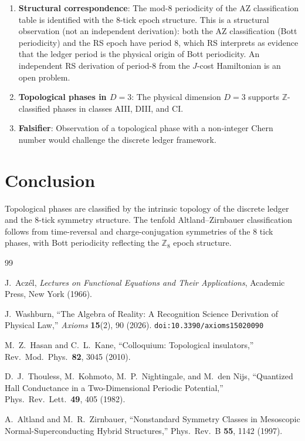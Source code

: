 \documentclass[12pt,a4paper]{article}
\theoremstyle{definition}
\theoremstyle{remark}
\begin{document}
\begin{enumerate}
  \item \textbf{Structural correspondence}: The mod-8 periodicity
  of the AZ classification table is identified with the 8-tick epoch
  structure.  This is a structural observation (not an independent
  derivation): both the AZ classification (Bott periodicity) and
  the RS epoch have period 8, which RS interprets as evidence that
  the ledger period is the physical origin of Bott periodicity.
  An independent RS derivation of period-8 from the $J$-cost
  Hamiltonian is an open problem.

  \item \textbf{Topological phases in $D = 3$}: The physical
  dimension $D = 3$ supports $\mathbb{Z}$-classified phases in
  classes AIII, DIII, and CI.

  \item \textbf{Falsifier}: Observation of a topological phase
  with a non-integer Chern number would challenge the discrete
  ledger framework.
\end{enumerate}

\section{Conclusion}
\label{sec:conclusion}

Topological phases are classified by the intrinsic topology of the
discrete ledger and the 8-tick symmetry structure.  The tenfold
Altland--Zirnbauer classification follows from time-reversal and
charge-conjugation symmetries of the 8 tick phases, with Bott
periodicity reflecting the $\mathbb{Z}_8$ epoch structure.

\begin{thebibliography}{99}

J.~Acz\'el, \emph{Lectures on Functional Equations and Their Applications},
Academic Press, New York (1966).

J.~Washburn, ``The Algebra of Reality: A Recognition Science Derivation
of Physical Law,'' \emph{Axioms} \textbf{15}(2), 90 (2026).
\texttt{doi:10.3390/axioms15020090}

M.~Z.~Hasan and C.~L.~Kane, ``Colloquium: Topological
insulators,'' Rev.\ Mod.\ Phys.\ \textbf{82}, 3045 (2010).

D.~J.~Thouless, M.~Kohmoto, M.~P.~Nightingale, and M.~den Nijs,
``Quantized Hall Conductance in a Two-Dimensional Periodic
Potential,'' Phys.\ Rev.\ Lett.\ \textbf{49}, 405 (1982).

A.~Altland and M.~R.~Zirnbauer, ``Nonstandard Symmetry Classes in
Mesoscopic Normal-Superconducting Hybrid Structures,''
Phys.\ Rev.\ B \textbf{55}, 1142 (1997).

\end{thebibliography}
\end{document}

